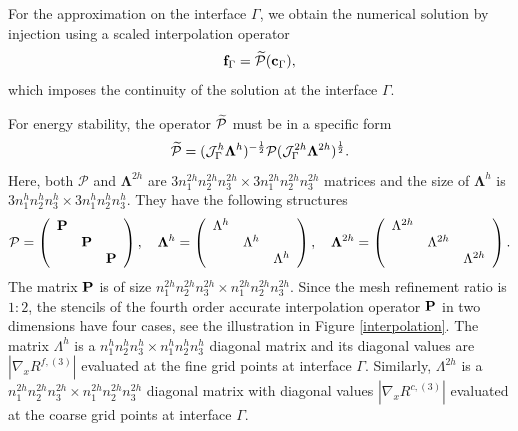 For the approximation on the interface $\Gamma$, we obtain the numerical solution by injection using a scaled interpolation operator
\begin{equation}\label{continuous_sol}
{\bf f}_{\Gamma} = \wt{\mathcal{P}}({\bf c}_{\Gamma}),
\end{equation}
which imposes the continuity of the solution at the interface $\Gamma$. 

For energy stability, the operator $ \widetilde{\mathcal{P}}$ must be in a specific form 
\[\widetilde{\mathcal{P}} = (\mathcal{J}^h_\Gamma \bm{\Lambda}^h)^{-\frac{1}{2}}\mathcal{P}(\mathcal{J}^{2h}_\Gamma \bm{\Lambda}^{2h})^{\frac{1}{2}}.\]
Here, both  $\mathcal{P}$ and $\bm{\Lambda}^{2h}$ are $3n_1^{2h}n_2^{2h}n_3^{2h}\times 3n_1^{2h}n_2^{2h}n_3^{2h}$ matrices and the size of $\bm{\Lambda}^{h}$ is $3n_1^{h}n_2^{h}n_3^{h}\times 3n_1^{h}n_2^{h}n_3^{h}$. They have the following structures
\begin{align*}\label{iandr}
\mathcal{P} = \left(\begin{array}{ccc}
{\bf P}& ~  & ~ \\
~ & {\bf P} & ~ \\
~ &~  &{\bf P}\end{array}\right), \ \ \ 
\bm{\Lambda}^h = \left(\begin{array}{ccc}
\Lambda^h& ~  & ~ \\
~ & \Lambda^h & ~ \\
~ &~  &\Lambda^h\end{array}\right), \ \ \ \bm{\Lambda}^{2h} = \left(\begin{array}{ccc}
\Lambda^{2h}& ~  & ~ \\
~ & \Lambda^{2h} & ~ \\
~ &~  &\Lambda^{2h}\end{array}\right).
\end{align*}
The matrix $\bf P$ is of size $n_1^{2h}n_2^{2h}n_3^{2h}\times n_1^{2h}n_2^{2h}n_3^{2h}$. Since the mesh refinement ratio is $1:2$, the stencils of the fourth order accurate interpolation operator ${\bf P}$ in two dimensions have four cases, see the illustration in  Figure \ref{interpolation}. 
The matrix $\Lambda^{h}$ is a $n_1^{h}n_2^{h}n_3^{h}\times n_1^{h}n_2^{h}n_3^{h}$ diagonal matrix and its diagonal values are $|\nabla_x R^{f,(3)}|$ evaluated at the fine grid points at interface $\Gamma$. Similarly, $\Lambda^{2h}$ is a $n_1^{2h}n_2^{2h}n_3^{2h}\times n_1^{2h}n_2^{2h}n_3^{2h}$ diagonal matrix with diagonal values  $|\nabla_x R^{c,(3)}|$ evaluated at the coarse grid points at interface $\Gamma$.

